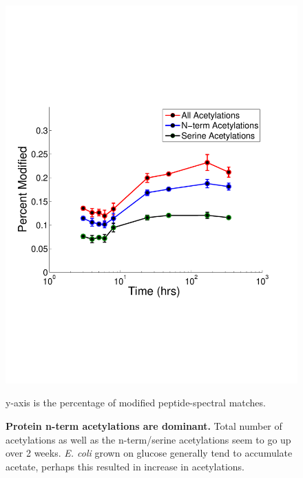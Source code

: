 \documentclass[12pt]{article}
\begin{document}
\clearpage
\begin{figure}[p]
\centerline{\includegraphics[width=5in]{Figures/Acetylation_AAs.pdf}}
\caption{\label{fig:Acet}\textbf{Protein n-term acetylations are dominant.} Total number of acetylations as well as the n-term/serine acetylations seem to go up over 2 weeks. \emph{E. coli} grown on glucose generally tend to accumulate acetate, perhaps this resulted in increase in acetylations.} y-axis is the percentage of modified peptide-spectral matches.
\end{figure}
\end{document}
